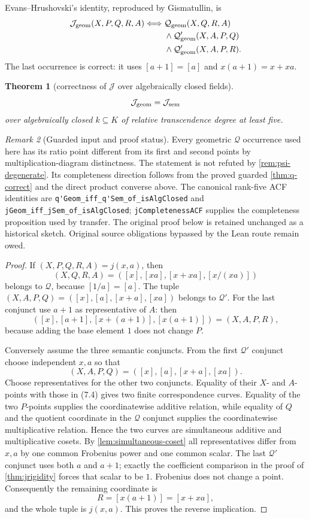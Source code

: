 \documentclass[11pt,oneside]{article}
\newtheorem{theorem}{Theorem}[section]
\theoremstyle{definition}
\theoremstyle{remark}
\newtheorem{remark}[theorem]{Remark}
\newcommand{\Qrel}{\mathcal{Q}}
\newcommand{\Qprel}{\mathcal{Q}'}
\newcommand{\Jrel}{\mathcal{J}}
\newcommand{\lean}[1]{\nolinkurl{#1}}
\begin{document}
Evans--Hrushovski's identity, reproduced by Gismatullin, is
\[
\begin{split}
\Jrel_{\rm geom}(X,P,Q,R,A)\Longleftrightarrow{}&
\Qrel_{\rm geom}(X,Q,R,A)\\
&\land\Qprel_{\rm geom}(X,A,P,Q)\\
&\land\Qprel_{\rm geom}(X,A,P,R).
\end{split}
\]
The last occurrence is correct: it uses $[a+1]=[a]$ and
$x(a+1)=x+xa$.

\begin{theorem}[correctness of $\Jrel$ over algebraically closed fields]
\label{thm:j-acf-correct}
\[
  \Jrel_{\rm geom}=\Jrel_{\rm sem}
\]
over algebraically closed $k\subseteq K$ of relative transcendence degree at least five.
\end{theorem}
\begin{remark}[Guarded input and proof status]
Every geometric $\Qrel$ occurrence used here has its ratio point different from
its first and second points by multiplication-diagram distinctness.  The statement
is not refuted by \cref{rem:psi-degenerate}.  Its completeness direction follows from the
proved guarded \cref{thm:q-correct} and the direct product converse above.  The canonical
rank-five ACF identities are \lean{q'Geom_iff_q'Sem_of_isAlgClosed} and
\lean{jGeom_iff_jSem_of_isAlgClosed}; \lean{jCompletenessACF} supplies the completeness
proposition used by transfer.  The original proof below is retained unchanged as a
historical sketch.  Original source obligations bypassed by the Lean route remain owed.
\end{remark}
\begin{proof}
If $(X,P,Q,R,A)=j(x,a)$, then
\[
 (X,Q,R,A)=([x],[xa],[x+xa],[x/(xa)])
\]
belongs to $\Qrel$, because $[1/a]=[a]$.  The tuple
$(X,A,P,Q)=([x],[a],[x+a],[xa])$ belongs to $\Qprel$.  For the last conjunct use
$a+1$ as representative of $A$: then
\[
 ([x],[a+1],[x+(a+1)],[x(a+1)])=(X,A,P,R),
\]
because adding the base element $1$ does not change $P$.

Conversely assume the three semantic conjuncts.  From the first $\Qprel$ conjunct choose
independent $x,a$ so that
\[
 (X,A,P,Q)=([x],[a],[x+a],[xa]).                               \tag{7.4}
\]
Choose representatives for the other two conjuncts.  Equality of their $X$- and
$A$-points with those in (7.4) gives two finite correspondence curves.  Equality of the
two $P$-points supplies the coordinatewise additive relation, while equality of $Q$ and
the quotient coordinate in the $\Qrel$ conjunct supplies the coordinatewise
multiplicative relation.  Hence the two curves are simultaneous additive and
multiplicative cosets.  By \cref{lem:simultaneous-coset} all representatives differ from
$x,a$ by one common Frobenius power and one common scalar.  The last $\Qprel$ conjunct
uses both $a$ and $a+1$; exactly the coefficient comparison in the proof of
\cref{thm:jrigidity} forces that scalar to be $1$.  Frobenius does not change a point.
Consequently the remaining coordinate is
\[
 R=[x(a+1)]=[x+xa],
\]
and the whole tuple is $j(x,a)$.  This proves the reverse implication.
\end{proof}
\end{document}
